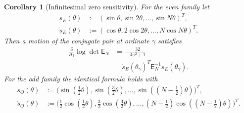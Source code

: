 \documentclass[preprint,12pt]{elsarticle}
\numberwithin{equation}{section}
\theoremstyle{plain}
\newtheorem{corollary}[theorem]{Corollary}
\theoremstyle{definition}
\theoremstyle{remark}
\newcommand{\E}{\mathsf E}
\begin{document}
\begin{corollary}[Infinitesimal zero sensitivity]
\label{cor:infinitesimal_zero_sensitivity}
For the even family let
\begin{equation}
\begin{aligned}
s_E(\theta)&:=(\sin\theta,\sin2\theta,\ldots,\sin N\theta)^T,\\
\dot s_E(\theta)&:=(\cos\theta,2\cos2\theta,\ldots,N\cos N\theta)^T.
\end{aligned}
\end{equation}
Then a motion of the conjugate pair at ordinate $\gamma$ satisfies
\begin{equation}
\boxed{\begin{aligned}
\frac{\partial}{\partial\gamma}\log\det\E_N
&=-\frac{32}{4\gamma^2+1}\,\\[-2pt]
&\quad\dot s_E(\theta_\gamma)^T\E_N^{-1}s_E(\theta_\gamma).
\end{aligned}}
\label{eq:E_zero_logdet_derivative}
\end{equation}
For the odd family the identical formula holds with
\begin{align}
s_O(\theta)&:=\bigl(\sin(\tfrac12\theta),\sin(\tfrac32\theta),\ldots,
\sin((N-\tfrac12)\theta)\bigr)^T,\\
\dot s_O(\theta)&:=\bigl(\tfrac12\cos(\tfrac12\theta),\tfrac32\cos(\tfrac32\theta),\ldots,
(N-\tfrac12)\cos((N-\tfrac12)\theta)\bigr)^T.
\end{align}
\end{corollary}
\end{document}
